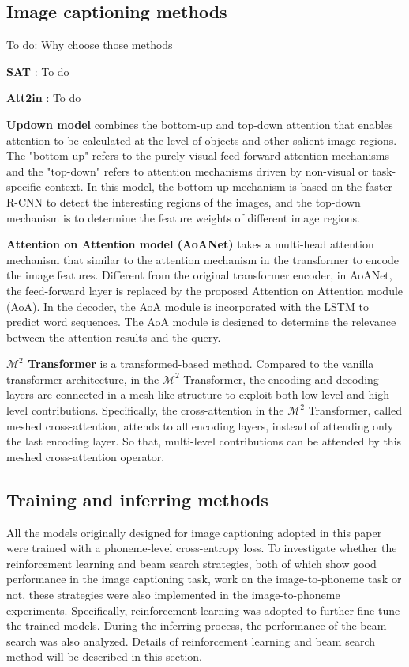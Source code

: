 \documentclass[journal,comsoc]{IEEEtran}
\begin{document}
\subsection{Image captioning methods}

To do: Why choose those methods

\textbf{SAT} \cite{xu2015show} : To do

\textbf{Att2in} \cite{rennie2017self}: To do

\textbf{Updown model} \cite{anderson2018bottom} combines the bottom-up and top-down attention that enables attention to be calculated at the level of objects and other salient image regions. The "bottom-up" refers to the purely visual feed-forward attention mechanisms and the "top-down" refers to attention mechanisms driven by non-visual or task-specific context. In this model, the bottom-up mechanism is based on the faster R-CNN to detect the interesting regions of the images, and the top-down mechanism is to determine the feature weights of different image regions.

\textbf{Attention on Attention model (AoANet)} \cite{huang2019attention} takes a multi-head attention mechanism that similar to the attention mechanism in the transformer to encode the image features. Different from the original transformer encoder, in AoANet, the feed-forward layer is replaced by the proposed Attention on Attention module (AoA). In the decoder, the AoA module is incorporated with the LSTM to predict word sequences. The AoA module is designed to determine the relevance between the attention results and the query. 


\textbf{$\mathcal{M}^2$ Transformer} \cite{cornia2020meshed} is a transformed-based method. Compared to the vanilla transformer architecture, in the $\mathcal{M}^2$ Transformer, the encoding and decoding layers are connected in a mesh-like structure to exploit both low-level and high-level contributions. Specifically, the cross-attention in the $\mathcal{M}^2$ Transformer, called meshed cross-attention, attends to all encoding layers, instead of attending only the last encoding layer. So that, multi-level contributions can be attended by this meshed cross-attention operator.




\subsection{Training and inferring methods}
All the models originally designed for image captioning adopted in this paper were trained with a phoneme-level cross-entropy loss. To investigate whether the reinforcement learning and beam search strategies, both of which show good performance in the image captioning task, work on the image-to-phoneme task or not, these strategies were also implemented in the image-to-phoneme experiments. Specifically, reinforcement learning was adopted to further fine-tune the trained models. During the inferring process, the performance of the beam search was also analyzed. Details of reinforcement learning and beam search method will be described in this section. 
\end{document}
